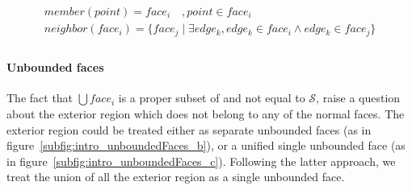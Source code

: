 \[
\begin{array}{l}
  \mathit{member}\left(point\right) = face_i \quad, point \in face_i \\
  \mathit{neighbor}\left(face_i\right) = \lbrace  face_j \mid \exists edge_k, edge_k \in face_i \land edge_k \in face_j \rbrace\\
\end{array}
\]

\paragraph{Unbounded faces}
The fact that $\bigcup face_i$ is a proper subset of and not equal to $\mathcal{S}$, raise a question about the exterior region which does not belong to any of the normal faces.
The exterior region could be treated either as separate unbounded faces (as in figure~\ref{subfig:intro_unboundedFaces_b}), or a unified single unbounded face (as in figure~\ref{subfig:intro_unboundedFaces_c}).
Following the latter approach, we treat the union of all the exterior region as a single unbounded face.

